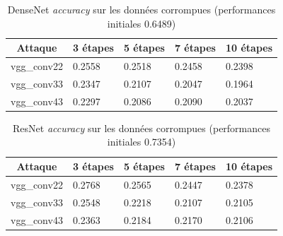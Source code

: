\documentclass{article}
\begin{document}
\begin{table}[!h]
\centering
\caption{DenseNet \textit{accuracy} sur les données corrompues (performances initiales 0.6489)}
\label{table:DenseNet_accuracy}
\begin{tabular}{|c|l|l|l|l|}
\hline
Attaque      & \multicolumn{1}{c|}{3 étapes} & \multicolumn{1}{c|}{5 étapes} & 7 étapes & 10 étapes \\ \hline
vgg\_conv22 & 0.2558                       & 0.2518                       & 0.2458  & 0.2398   \\ \hline
vgg\_conv33 & 0.2347                       & 0.2107                       & 0.2047  & 0.1964   \\ \hline
vgg\_conv43 & 0.2297                       & 0.2086                       & 0.2090  & 0.2037   \\ \hline
\end{tabular}
\end{table}

\begin{table}[!h]
\centering
\caption{ResNet \textit{accuracy} sur les données corrompues (performances initiales 0.7354)}
\label{table:ResNet_accuracy}
\begin{tabular}{|c|l|l|l|l|}
\hline
Attaque      & \multicolumn{1}{c|}{3 étapes} & \multicolumn{1}{c|}{5 étapes} & 7 étapes & 10 étapes \\ \hline
vgg\_conv22 & 0.2768                       & 0.2565                       & 0.2447  & 0.2378   \\ \hline
vgg\_conv33 & 0.2548                       & 0.2218                       & 0.2107  & 0.2105   \\ \hline
vgg\_conv43 & 0.2363                       & 0.2184                       & 0.2170  & 0.2106   \\ \hline
\end{tabular}
\end{table}
\end{document}
